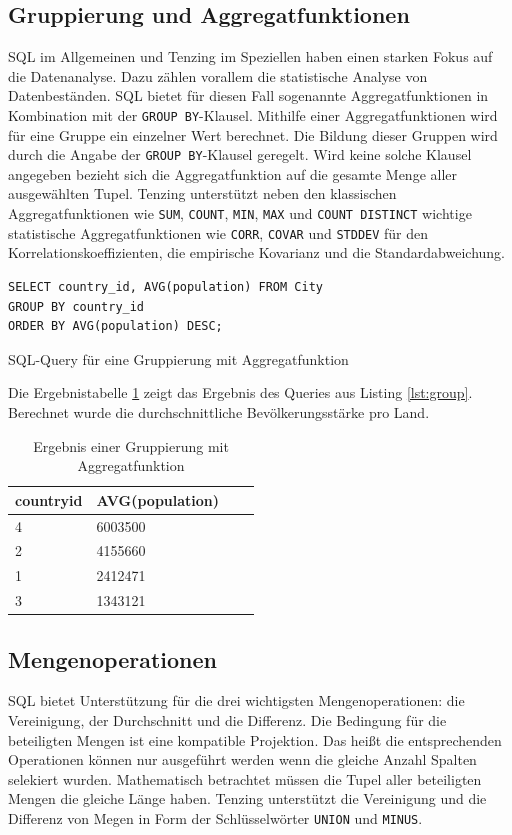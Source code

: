 \documentclass[a4paper]{article}
\begin{document}
\newpage
\subsection{Gruppierung und Aggregatfunktionen}
SQL im Allgemeinen und Tenzing im Speziellen haben einen starken Fokus auf die Datenanalyse. Dazu zählen vorallem die statistische Analyse von Datenbeständen. SQL bietet für diesen Fall sogenannte Aggregatfunktionen in Kombination mit der \texttt{GROUP BY}-Klausel. Mithilfe einer Aggregatfunktionen wird für eine Gruppe ein einzelner Wert berechnet. Die Bildung dieser Gruppen wird durch die Angabe der \texttt{GROUP BY}-Klausel geregelt. Wird keine solche Klausel angegeben bezieht sich die Aggregatfunktion auf die gesamte Menge aller ausgewählten Tupel. Tenzing unterstützt neben den klassischen Aggregatfunktionen wie \texttt{SUM}, \texttt{COUNT}, \texttt{MIN}, \texttt{MAX} und \texttt{COUNT DISTINCT} wichtige statistische Aggregatfunktionen wie \texttt{CORR}, \texttt{COVAR} und \texttt{STDDEV} für den Korrelationskoeffizienten, die empirische Kovarianz und die Standardabweichung.

\begin{listing}[H]
\begin{verbatim}
SELECT country_id, AVG(population) FROM City 
GROUP BY country_id 
ORDER BY AVG(population) DESC;
\end{verbatim}
\caption{SQL-Query für eine Gruppierung mit Aggregatfunktion}
\label{lst:group}
\end{listing}

Die Ergebnistabelle \ref{tab:group} zeigt das Ergebnis des Queries aus Listing \ref{lst:group}. Berechnet wurde die durchschnittliche Bevölkerungsstärke pro Land.

\begin{table}[H]
\centering
  \begin{tabular}{| l | l | l | l |}
    \hline
     country\protect{\textunderscore}id & AVG(population) \\ \hline
    \hline
    4 & 6003500 \\ \hline
    2 & 4155660 \\ \hline
    1 & 2412471 \\ \hline
    3 & 1343121 \\ \hline
  \end{tabular}
\caption{Ergebnis einer Gruppierung mit Aggregatfunktion}
\label{tab:group}
\end{table}

\newpage
\subsection{Mengenoperationen}
SQL bietet Unterstützung für die drei wichtigsten Mengenoperationen: die Vereinigung, der Durchschnitt und die Differenz. Die Bedingung für die beteiligten Mengen ist eine kompatible Projektion. Das heißt die entsprechenden Operationen können nur ausgeführt werden wenn die gleiche Anzahl Spalten selekiert wurden. Mathematisch betrachtet müssen die Tupel aller beteiligten Mengen die gleiche Länge haben. Tenzing unterstützt die Vereinigung und die Differenz von Megen in Form der Schlüsselwörter \texttt{UNION} und \texttt{MINUS}.
\end{document}
